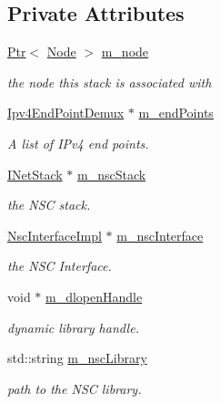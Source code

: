 \subsection*{Private Attributes}
\begin{DoxyCompactItemize}
\item 
\hyperlink{classns3_1_1Ptr}{Ptr}$<$ \hyperlink{classns3_1_1Node}{Node} $>$ \hyperlink{classns3_1_1NscTcpL4Protocol_a1a7121d0e0f775582e6b01a3e7bc1a6c}{m\+\_\+node}
\begin{DoxyCompactList}\small\item\em the node this stack is associated with \end{DoxyCompactList}\item 
\hyperlink{classns3_1_1Ipv4EndPointDemux}{Ipv4\+End\+Point\+Demux} $\ast$ \hyperlink{classns3_1_1NscTcpL4Protocol_a5cc20dcc5c7877b042c1179f11af6a90}{m\+\_\+end\+Points}
\begin{DoxyCompactList}\small\item\em A list of I\+Pv4 end points. \end{DoxyCompactList}\item 
\hyperlink{structINetStack}{I\+Net\+Stack} $\ast$ \hyperlink{classns3_1_1NscTcpL4Protocol_abf40617904f5f2e4424ab79545efb04f}{m\+\_\+nsc\+Stack}
\begin{DoxyCompactList}\small\item\em the N\+SC stack. \end{DoxyCompactList}\item 
\hyperlink{classns3_1_1NscInterfaceImpl}{Nsc\+Interface\+Impl} $\ast$ \hyperlink{classns3_1_1NscTcpL4Protocol_aa73774a195b1e7d8ca31addef75e3454}{m\+\_\+nsc\+Interface}
\begin{DoxyCompactList}\small\item\em the N\+SC Interface. \end{DoxyCompactList}\item 
void $\ast$ \hyperlink{classns3_1_1NscTcpL4Protocol_ac71d70c67385bf9ac7f41fa5f5366bf7}{m\+\_\+dlopen\+Handle}
\begin{DoxyCompactList}\small\item\em dynamic library handle. \end{DoxyCompactList}\item 
std\+::string \hyperlink{classns3_1_1NscTcpL4Protocol_a2ccb18257227f0616ebaaf553cea7fb7}{m\+\_\+nsc\+Library}
\begin{DoxyCompactList}\small\item\em path to the N\+SC library. \end{DoxyCompactList}\item 

\end{DoxyCompactItemize}
